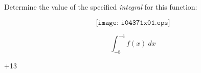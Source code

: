 

Determine the value of the specified {\it integral} for this function:

$$\texttt{[image: i04371x01.eps]}$$

$$\int_{-8}^{-4} f(x) \> dx$$







+13











